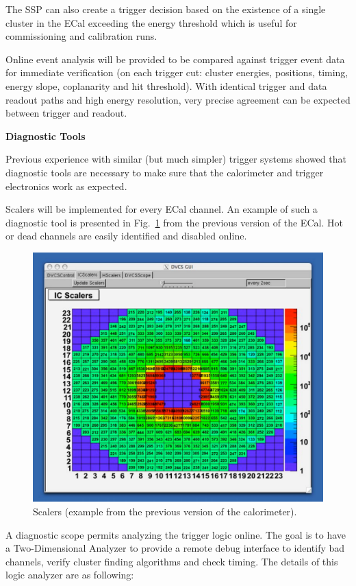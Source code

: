 The SSP can also create a trigger decision based on the existence of a single cluster in the ECal exceeding the energy threshold which is  useful for commissioning and calibration runs. 

Online event analysis will be provided to be compared against trigger event data for immediate verification (on each trigger cut: cluster energies, positions, timing, energy slope, coplanarity and hit threshold). With identical trigger and data readout paths and high energy resolution, very precise agreement can be expected between trigger and readout.



\vspace{1cm}
{\bf Diagnostic Tools}

Previous experience with similar (but much simpler) trigger systems showed that diagnostic tools are necessary to make sure that the calorimeter and trigger electronics work as expected. 

Scalers will be implemented for every ECal channel. An example of such a diagnostic tool is presented in Fig.~\ref{fig:dvcs_beam}
from the previous version of the ECal. Hot or dead channels are easily identified and disabled online.
\begin{figure}[ht]
\includegraphics[scale=0.52]{daq_trigger/figures/dvcs_beam}
\caption{\small{Scalers (example from the previous version of the calorimeter).}}
\label{fig:dvcs_beam}
\end{figure}
A diagnostic scope permits analyzing the trigger logic online. The goal is to have a Two-Dimensional Analyzer
 to provide a remote debug interface to identify bad channels, verify cluster finding algorithms and check timing.
 The details of this logic analyzer are as following:
 
